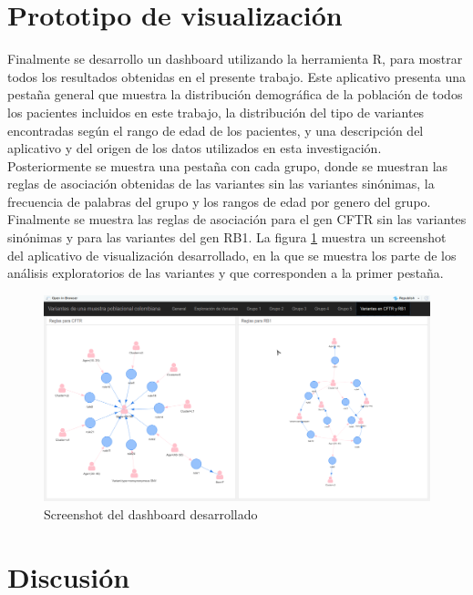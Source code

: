 \section{Prototipo de visualización}

Finalmente se desarrollo un dashboard utilizando la herramienta R, para mostrar todos los resultados obtenidas en el presente trabajo. Este aplicativo presenta una pestaña general que muestra la distribución demográfica de la población de todos los pacientes incluidos en este trabajo, la distribución del tipo de variantes encontradas según el rango de edad de los pacientes, y una descripción del aplicativo y del origen de los datos utilizados en esta investigación. Posteriormente se muestra una pestaña con cada grupo, donde se muestran las reglas de asociación obtenidas de las variantes sin las variantes sinónimas, la frecuencia de palabras del grupo y los rangos de edad por genero del grupo. Finalmente se muestra las reglas de asociación para el gen CFTR  sin las variantes sinónimas y para las variantes del gen RB1. La figura \ref{fig:dash} muestra un screenshot  del aplicativo de visualización desarrollado, en la que se muestra los parte de los análisis exploratorios de las variantes y que corresponden a la primer pestaña.

\begin{figure}[H]
	\centering
	\includegraphics[width=1\textwidth]{Kap4/dash}
	\caption{Screenshot del dashboard desarrollado} \label{fig:dash}
\end{figure}

\section{Discusión}

